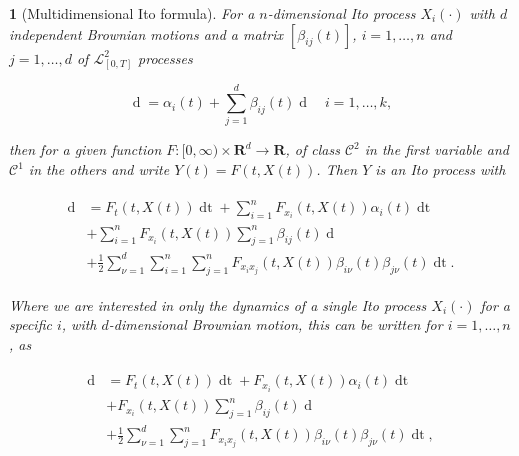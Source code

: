 \documentclass[british]{amsart} \usepackage{lmodern}
\numberwithin{equation}{section} \numberwithin{figure}{section}
\theoremstyle{plain} \newtheorem{thm}{\protect\theoremname}[section]
\theoremstyle{definition} \newtheorem{defn}[thm]{\protect\definitionname}
\theoremstyle{plain} \newtheorem{assumption}[thm]{\protect\assumptionname}
\theoremstyle{plain} \newtheorem{lem}[thm]{\protect\lemmaname}
\theoremstyle{plain} \newtheorem{prop}[thm]{\protect\propositionname}
\theoremstyle{remark} \newtheorem{rem}[thm]{\protect\remarkname}
\theoremstyle{plain} \newtheorem{cor}[thm]{\protect\corollaryname}
\renewcommand{\d}[1]{\mathop{\mathrm{d}{#1}}}
\newcommand{\rangei}{i=1,\dots,n} \newcommand{\measure}{\mathbb{P}}
\begin{document}
\begin{thm} [Multidimensional Ito formula]

  For a $n$-dimensional Ito process $X_{i}(\cdot)$ with $d$ independent Brownian motions and a
  matrix $[\beta_{ij}(t)]$, $i=1,\dots,n$ and $j=1,\dots,d$ of $\mathcal{L}_{[0,T]}^{2}$ processes

  \begin{equation}
    \d{X_{i}(t)} = \alpha_i(t) + \sum_{j=1}^d \beta_{ij}(t)\d{W_{j}(t)}
    \quad i=1,\dots,k,
  \end{equation}

  then for a given function $F:[0,\infty) \times \mathbf{R}^d \to \mathbf{R}$, of
  class $\mathcal{C}^2$ in the first variable and $\mathcal{C}^1$ in the others
  and write $Y(t)=F(t,X(t))$. Then $Y$ is an Ito process with

   \begin{gather}
    \begin{split}
    \d{Y(t)} &= F_{t}(t, X(t))\d{t} + \sum_{i=1}^n F_{x_{i}}(t,X(t)) \alpha_{i}(t)\d{t} \\
             & + \sum_{i=1}^n F_{x_{i}}(t,X(t)) \sum_{j=1}^n \beta_{ij}(t)\d{W_{j}(t)} \\
             & + \frac{1}{2} \sum_{\nu=1}^d \sum_{i=1}^n \sum_{j=1}^n
                  F_{x_{i}x_{j}}(t,X(t)) \beta_{i\nu}(t) \beta_{j\nu}(t)\d{t}.
    \end{split}
  \end{gather}

  Where we are interested in only the dynamics of a single Ito process
  $X_{i}(\cdot)$ for a specific $i$, with $d$-dimensional Brownian motion, this
  can be written for $\rangei$, as

  \begin{gather}
    \begin{split}
    \d{Y(t)} &= F_{t}(t, X(t))\d{t} + F_{x_{i}}(t,X(t)) \alpha_{i}(t)\d{t} \\
             & + F_{x_{i}}(t,X(t)) \sum_{j=1}^n \beta_{ij}(t)\d{W_{j}(t)} \\
             & + \frac{1}{2} \sum_{\nu=1}^d \sum_{j=1}^n F_{x_{i}x_{j}}(t,X(t))
                \beta_{i\nu}(t) \beta_{j\nu}(t)\d{t},\\
    \end{split}
  \end{gather}


\end{thm}

\newpage
\end{document}
